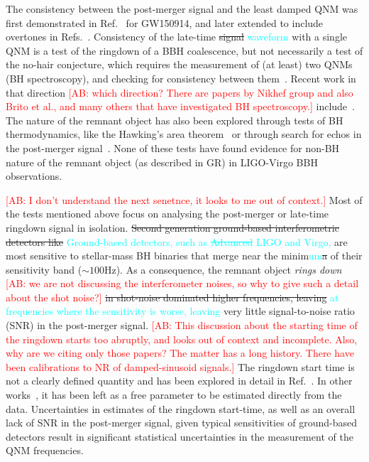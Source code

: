 \documentclass[twocolumn,prd,superscriptaddress,amsfonts,amssymb,amsmath,preprintnumbers]{revtex4-1}
\newcommand{\ab}[1]{\textcolor{cyan}{#1}}
\newcommand{\comment}[1]{\textcolor{red}{[#1]}}
\begin{document}
The consistency between the post-merger signal and the least damped QNM was first demonstrated in 
Ref.~\citep{LSC_2016grtests} for GW150914, and later extended to include
overtones in Refs.~\citep{Brito:2018rfr,Giesler:2019uxc,Isi:2019aib,Bhagwat:2019dtm,Forteza:2020hbw}. Consistency
of the late-time \sout{signal} \ab{waveform} with a single QNM is a test of the ringdown of
a BBH coalescence, but not necessarily a test of the no-hair
conjecture, which requires the measurement of (at least) two QNMs (BH
spectroscopy), and checking for consistency between them~\cite{Dreyer:2003bv,Berti:2005ys}. Recent work
in that direction \comment{AB: which direction? There are papers by Nikhef group and 
also Brito et al., and many others that have investigated BH spectroscopy.} include~\citep{Carullo:2018gah,Carullo:2019flw,Bhagwat:2019bwv}. The
nature of the remnant object has also been explored through tests of
BH thermodynamics, like the Hawking's area
theorem~\citep{Cabero:2017avf} or through search for echos in the
post-merger
signal~\citep{Nielsen:2018lkf,Tsang:2019zra,Lo:2018sep,Abedi:2018npz,Abedi:2020sgg,Testa:2018bzd}. None
of these tests have found evidence for non-BH nature of the remnant
object (as described in GR) in LIGO-Virgo BBH observations.

\comment{AB: I don't understand the next senetnce, it looks to me out of context.} 
Most of the tests mentioned above focus on analysing the post-merger
or late-time ringdown signal in isolation. \sout{Second generation
ground-based interferometric detectors like} \ab{Ground-based detectors, 
such as \sout{Advanced} LIGO and Virgo,} are most sensitive to 
stellar-mass BH binaries that merge near the
minim\ab{um}\sout{a} of their sensitivity band ($\sim 100$Hz). As a consequence, the
remnant object \textit{rings down} \comment{AB: we are not discussing the interferometer noises, 
so why to give such a detail about the shot noise?} \sout{in shot-noise dominated higher
frequencies, leaving} \ab{at frequencies where the sensitivity is worse, leaving} 
very little signal-to-noise ratio (SNR) in the
post-merger signal. \comment{AB: This discussion about the starting time of the ringdown starts too abruptly, 
and looks out of context and incomplete. Also, why are we citing only those papers? The matter 
has a long history. There have been calibrations to NR of damped-sinusoid signals.} 
The ringdown start time is not a clearly defined
quantity and has been explored in detail
in Ref.~\citep{Bhagwat:2017tkm}. In other
works~\citep{Carullo:2018gah,Carullo:2019flw}, it has been left as a
free parameter to be estimated directly from the data. Uncertainties
in estimates of the ringdown start-time, as well as an overall lack of
SNR in the post-merger signal, given typical sensitivities of
ground-based detectors result in significant statistical uncertainties
in the measurement of the QNM frequencies. 
\end{document}
